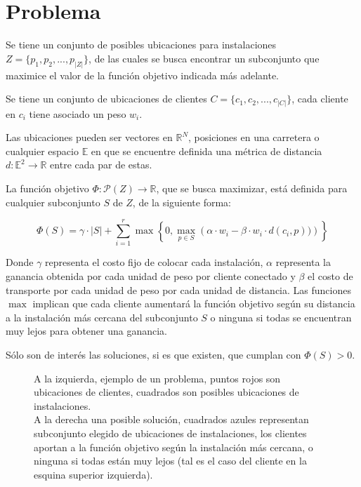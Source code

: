\section{Problema}


Se tiene un conjunto de posibles ubicaciones para instalaciones $Z = \{p_1,p_2,...,p_{|Z|}\}$, de las cuales se busca encontrar un subconjunto que maximice el valor de la función objetivo indicada más adelante.

Se tiene un conjunto de ubicaciones de clientes $C = \{c_1,c_2,...,c_{|C|}\}$, cada cliente en $c_i$ tiene asociado un peso $w_i$.

Las ubicaciones pueden ser vectores en $\mathbb{R}^N$, posiciones en una carretera o cualquier espacio $\mathbb{E}$ en que se encuentre definida una métrica de distancia $d : \mathbb{E}^2 \rightarrow \mathbb{R}$ entre cada par de estas.

La función objetivo $\Phi : \mathcal{P}(Z) \rightarrow \mathbb{R}$, que se busca maximizar, está definida para cualquier subconjunto $S$ de $Z$, de la siguiente forma:

\begin{equation}
\Phi(S) = \gamma \cdot |S| + \sum_{i=1}^r \max \left\{0 , \max_{p \in S} \left(
    \alpha \cdot w_i - \beta \cdot w_i \cdot d(c_i,p))
\right) \right\}
\end{equation}

Donde $\gamma$ representa el costo fijo de colocar cada instalación, $\alpha$ representa la ganancia obtenida por cada unidad de peso por cliente conectado y $\beta$ el costo de transporte por cada unidad de peso por cada unidad de distancia. Las funciones $\max$ implican que cada cliente aumentará la función objetivo según su distancia a la instalación más cercana del subconjunto $S$ o ninguna si todas se encuentran muy lejos para obtener una ganancia.

Sólo son de interés las soluciones, si es que existen, que cumplan con $\Phi(S) > 0$.

\begin{figure}%
    \centering
    \qquad \qquad \qquad
    \caption{A la izquierda, ejemplo de un problema, puntos rojos son ubicaciones de clientes, cuadrados son posibles ubicaciones de instalaciones.\\A la derecha una posible solución, cuadrados azules representan subconjunto elegido de ubicaciones de instalaciones, los clientes aportan a la función objetivo según la instalación más cercana, o ninguna si todas están muy lejos (tal es el caso del cliente en la esquina superior izquierda).}
    \label{fig:example}
\end{figure}
